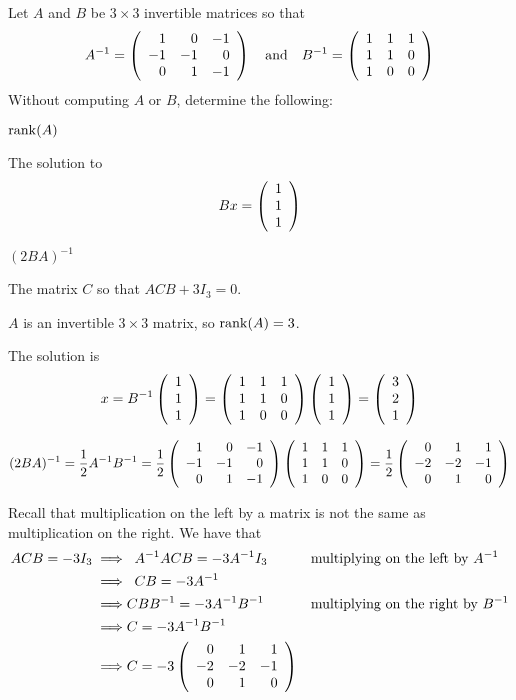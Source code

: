 \documentclass{ximera}
\begin{document}
\begin{exercise} \label{A3.7.1}
Let $A$ and $B$ be $3\times 3$ invertible matrices so that
\[
A^{-1} = \left(\begin{array}{rrrrrrrrrrrrrrrrrr} 1 & 0 & -1 \\ -1 & -1 &0 \\ 0 & 1 & -1 \end{array}\right)
\quad\text{and}\quad
B^{-1} = \left(\begin{array}{rrrrrrrrrrrrrrrrrr} 1 & 1 & 1 \\ 1 &1 &0 \\ 1 & 0 & 0 \end{array}\right)
\]
Without computing $A$ or $B$, determine the following:
\begin{enumeratea}
\item ${\rm rank}(A)$
\item The solution to 
\[
Bx=\left(\begin{array}{rrrrrrrrrrrrrrrrrr} 1 \\ 1 \\ 1 \end{array}\right)
\]
\item $(2BA)^{-1}$
\item The matrix $C$ so that $ACB+3I_3=0$.
\end{enumeratea} 



\begin{solution}

\soln

\begin{enumeratea}
\item $A$ is an invertible $3\times 3$ matrix, so ${\rm rank}(A)=3$.
\item The solution is 
\[
x = B^{-1}\left(\begin{array}{rrrrrrrrrrrrrrrrrr} 1 \\ 1 \\ 1 \end{array}\right)= \left(\begin{array}{rrrrrrrrrrrrrrrrrr} 1 & 1 & 1 \\ 1 &1 &0 \\ 1 & 0 & 0 \end{array}\right) \left(\begin{array}{rrrrrrrrrrrrrrrrrr} 1 \\ 1 \\ 1 \end{array}\right)=\left(\begin{array}{rrrrrrrrrrrrrrrrrr} 3 \\ 2 \\ 1 \end{array}\right)
\]
\item 
\[
(2BA)^{-1}=\frac{1}{2}A^{-1}B^{-1}=\frac{1}{2}
\left(\begin{array}{rrrrrrrrrrrrrrrrrr} 1 & 0 & -1 \\  -1 &-1 &0 \\  0 & 1 & -1 \end{array}\right)
\left(\begin{array}{rrrrrrrrrrrrrrrrrr} 1 & 1 & 1 \\  1 &1 &0 \\  1 & 0 & 0 \end{array}\right)
=\frac{1}{2}\left(\begin{array}{rrrrrrrrrrrrrrrrrr}  0 & 1 & 1 \\ -2 &-2 &-1 \\ 0 & 1 & 0 \end{array}\right)
\]
\item Recall that multiplication on the left by a matrix is not the same as multiplication on the right. We have that
\begin{align*}
ACB=-3I_3\implies&\;\;  A^{-1}ACB=-3A^{-1}I_3 &&\text{multiplying on the left by $A^{-1}$}\\
\implies & \;\; CB=-3A^{-1}\\
\implies & CBB^{-1}=-3A^{-1}B^{-1}&&\text{multiplying on the right by $B^{-1}$}\\
\implies & C=-3A^{-1}B^{-1}\\
\implies & C=-3\left(\begin{array}{rrrrrrrrrrrrrrrrrr}  0 & 1 & 1 \\ -2 &-2 &-1 \\ 0 & 1 & 0 \end{array}\right)
\end{align*}
\end{enumeratea}
\end{solution}
\end{exercise}
\end{document}

